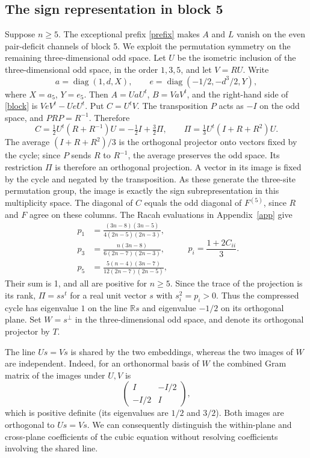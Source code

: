 \documentclass[11pt]{article}
\DeclareMathOperator{\diag}{diag}
\begin{document}
\subsection{The sign representation in block 5}\label{signsection}
Suppose $n\ge5$. The exceptional prefix \eqref{prefix} makes $A$ and $L$ vanish on the even pair-deficit channels of block 5. We exploit the permutation symmetry on the remaining three-dimensional odd space. Let $U$ be the isometric inclusion of the three-dimensional odd space, in the order $1,3,5$, and let $V=RU$. Write
\[
 a=\diag(1,d,X),\qquad e=\diag(-1/2,-d^3/2,Y),
\]
where $X=a_5$, $Y=e_5$. Then $A=UaU^t$, $B=VaV^t$, and the right-hand side of \eqref{block} is $VeV^t-UeU^t$. Put $C=U^tV$. The transposition $P$ acts as $-I$ on the odd space, and $PRP=R^{-1}$. Therefore
\[
 C=\tfrac12 U^t(R+R^{-1})U=-\tfrac12 I+\tfrac32\Pi,
 \qquad \Pi=\tfrac13 U^t(I+R+R^2)U.
\]
The average $(I+R+R^2)/3$ is the orthogonal projector onto vectors fixed by the cycle; since $P$ sends $R$ to $R^{-1}$, the average preserves the odd space. Its restriction $\Pi$ is therefore an orthogonal projection. A vector in its image is fixed by the cycle and negated by the transposition. As these generate the three-site permutation group, the image is exactly the sign subrepresentation in this multiplicity space. The diagonal of $C$ equals the odd diagonal of $F^{(5)}$, since $R$ and $F$ agree on these columns. The Racah evaluations in Appendix~\ref{app} give
\begin{equation}\label{weights}
\begin{aligned}
 p_1&=\frac{(3n-8)(3n-5)}{4(2n-5)(2n-3)},\\
 p_3&=\frac{n(3n-8)}{6(2n-7)(2n-3)},\\
 p_5&=\frac{5(n-4)(3n-7)}{12(2n-7)(2n-5)},
\end{aligned}
\qquad p_i=\frac{1+2C_{ii}}3.
\end{equation}
Their sum is 1, and all are positive for $n\ge5$. Since the trace of the projection is its rank, $\Pi=ss^t$ for a real unit vector $s$ with $s_i^2=p_i>0$. Thus the compressed cycle has eigenvalue $1$ on the line $\mathbb Rs$ and eigenvalue $-1/2$ on its orthogonal plane. Set $W=s^\perp$ in the three-dimensional odd space, and denote its orthogonal projector by $T$.

The line $Us=Vs$ is shared by the two embeddings, whereas the two images of $W$ are independent. Indeed, for an orthonormal basis of $W$ the combined Gram matrix of the images under $U,V$ is
\[
 \begin{pmatrix}I&-I/2\\-I/2&I\end{pmatrix},
\]
which is positive definite (its eigenvalues are $1/2$ and $3/2$). Both images are orthogonal to $Us=Vs$. We can consequently distinguish the within-plane and cross-plane coefficients of the cubic equation without resolving coefficients involving the shared line.
\end{document}
